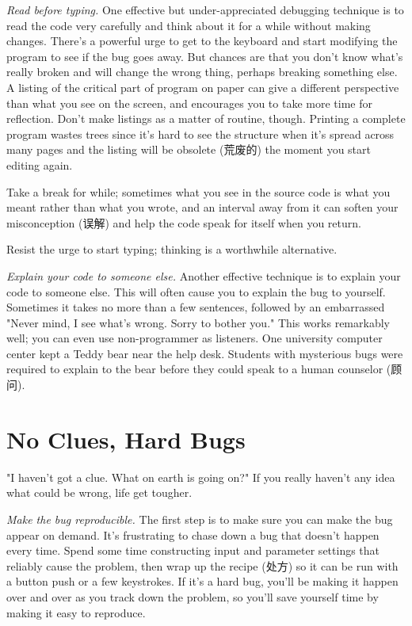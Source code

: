 \emph{Read before typing.} One effective but under-appreciated debugging
technique is to read the code very carefully and think about it for a while
without making changes. There's a powerful urge to get to the keyboard and
start modifying the program to see if the bug goes away. But chances are
that you don't know what's really broken and will change the wrong thing,
perhaps breaking something else. A listing of the critical part
of program on paper can give a different perspective than what you see on
the screen, and encourages you to take more time for reflection. Don't make
listings as a matter of routine, though. Printing a complete program wastes
trees since it's hard to see the structure when it's spread across many
pages and the listing will be obsolete (荒废的) the moment you start
editing again.

Take a break for while; sometimes what you see in the source code is what
you meant rather than what you wrote, and an interval away from it can
soften your misconception (误解) and help the code speak for itself when
you return.

Resist the urge to start typing; thinking is a worthwhile alternative.

\emph{Explain your code to someone else.} Another effective technique is to
explain your code to someone else. This will often cause you to explain the
bug to yourself. Sometimes it takes no more than a few sentences, followed
by an embarrassed "Never mind, I see what's wrong. Sorry to bother you."
This works remarkably well; you can even use non-programmer as listeners.
One university computer center kept a Teddy bear near the help desk.
Students with mysterious bugs were required to explain to the bear before
they could speak to a human counselor (顾问).

\section{No Clues, Hard Bugs}
"I haven't got a clue. What on earth is going on?" If you really haven't
any idea what could be wrong, life get tougher.

\emph{Make the bug reproducible.} The first step is to make sure you can
make the bug appear on demand. It's frustrating to chase down a bug that
doesn't happen every time. Spend some time constructing input and parameter
settings that reliably cause the problem, then wrap up the recipe (处方) so
it can be run with a button push or a few keystrokes. If it's a hard bug,
you'll be making it happen over and over as you track down the problem, so
you'll save yourself time by making it easy to reproduce.

